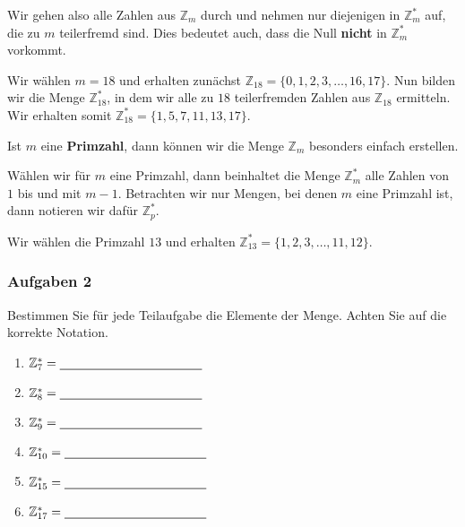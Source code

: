 Wir gehen also alle Zahlen aus $\mathbb{Z}_m$ durch und nehmen nur diejenigen in $\mathbb{Z}_m^*$ auf, die zu $m$ teilerfremd sind. Dies bedeutet auch, dass die Null \textbf{nicht} in $\mathbb{Z}_m^*$ vorkommt.

\begin{example}
	Wir wählen $m = 18$ und erhalten zunächst $\mathbb{Z}_{18} = \{0, 1, 2, 3, \dots, 16, 17 \}$. Nun bilden wir die Menge $\mathbb{Z}_{18}^*$, in dem wir alle zu $18$ teilerfremden Zahlen aus $\mathbb{Z}_{18}$ ermitteln. Wir erhalten somit $\mathbb{Z}_{18}^* = \{1, 5, 7, 11, 13, 17 \}$.
\end{example}

Ist $m$ eine \textbf{Primzahl}, dann können wir die Menge $\mathbb{Z}_m$ besonders einfach erstellen.

\begin{definition}[$\mathbb{Z}_p^*$]
	Wählen wir für $m$ eine Primzahl, dann beinhaltet die Menge $\mathbb{Z}_m^*$ alle Zahlen von $1$ bis und mit $m - 1$. Betrachten wir nur Mengen, bei denen $m$ eine Primzahl ist, dann notieren wir dafür $\mathbb{Z}_p^*$. 
\end{definition}

\begin{example}
	Wir wählen die Primzahl $13$ und erhalten $\mathbb{Z}_{13}^*=\{1, 2, 3, \dots, 11, 12 \}$.
\end{example}

\subsubsection{Aufgaben 2}

Bestimmen Sie für jede Teilaufgabe die Elemente der Menge. Achten Sie auf die korrekte Notation.

\begin{multicols}{2}
\begin{enumerate}
	\item $\mathbb{Z}_{7}^* = \rule[-0.75mm]{4cm}{.5pt}$
	\item $\mathbb{Z}_{8}^* = \rule[-0.75mm]{4cm}{.5pt}$
	\item $\mathbb{Z}_{9}^* = \rule[-0.75mm]{4cm}{.5pt}$
	\item $\mathbb{Z}_{10}^* = \rule[-0.75mm]{4cm}{.5pt}$
	\item $\mathbb{Z}_{15}^* = \rule[-0.75mm]{4cm}{.5pt}$
	\item $\mathbb{Z}_{17}^* = \rule[-0.75mm]{4cm}{.5pt}$
\end{enumerate}
\end{multicols}


